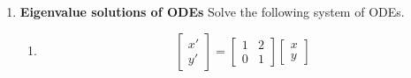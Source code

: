 \documentclass[letterpaper, fontsize=12pt]{scrartcl} %
\numberwithin{equation}{section} %
\numberwithin{figure}{section} %
\numberwithin{table}{section} %
\begin{document}
\begin{enumerate}

\item \textbf{Eigenvalue solutions of ODEs}
Solve the following system of ODEs.
\begin{enumerate}[label=(\alph*)]
\item 
\[ \begin{bmatrix} x' \\ y'  \end{bmatrix} = \begin{bmatrix} 1 & 2 \\ 0 & 1 \end{bmatrix} \begin{bmatrix} x \\ y \end{bmatrix} \]

\end{enumerate}
\end{enumerate}
\end{document}
